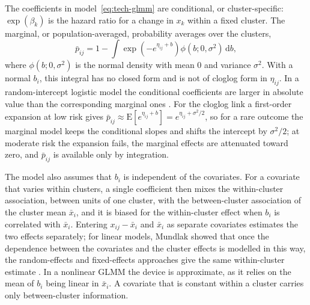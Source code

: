 The coefficients in model~\eqref{eq:tech-glmm} are conditional, or cluster-specific: $\exp(\beta_k)$ is the hazard ratio for a change in $x_k$ within a fixed cluster.
The marginal, or population-averaged, probability averages over the clusters,
\begin{equation}
  \bar{p}_{ij} = 1 - \int \exp\!\left(-e^{\eta_{ij} + b}\right) \phi(b; 0, \sigma^2)\,\mathrm{d}b ,
  \label{eq:tech-glmm-marginal}
\end{equation}
where $\phi(b; 0, \sigma^2)$ is the normal density with mean 0 and variance $\sigma^2$.
With a normal $b_i$, this integral has no closed form and is not of cloglog form in $\eta_{ij}$.
In a random-intercept logistic model the conditional coefficients are larger in absolute value than the corresponding marginal ones \cite{pavlou2015marginal}.
For the cloglog link a first-order expansion at low risk gives $\bar{p}_{ij} \approx \mathrm{E}[e^{\eta_{ij} + b}] = e^{\eta_{ij} + \sigma^2/2}$, so for a rare outcome the marginal model keeps the conditional slopes and shifts the intercept by $\sigma^2/2$; at moderate risk the expansion fails, the marginal effects are attenuated toward zero, and $\bar{p}_{ij}$ is available only by integration.

The model also assumes that $b_i$ is independent of the covariates.
For a covariate that varies within clusters, a single coefficient then mixes the within-cluster association, between units of one cluster, with the between-cluster association of the cluster mean $\bar{x}_i$, and it is biased for the within-cluster effect when $b_i$ is correlated with $\bar{x}_i$.
Entering $x_{ij} - \bar{x}_i$ and $\bar{x}_i$ as separate covariates estimates the two effects separately; for linear models, Mundlak showed that once the dependence between the covariates and the cluster effects is modelled in this way, the random-effects and fixed-effects approaches give the same within-cluster estimate \cite{mundlak1978pooling}.
In a nonlinear GLMM the device is approximate, as it relies on the mean of $b_i$ being linear in $\bar{x}_i$.
A covariate that is constant within a cluster carries only between-cluster information.

